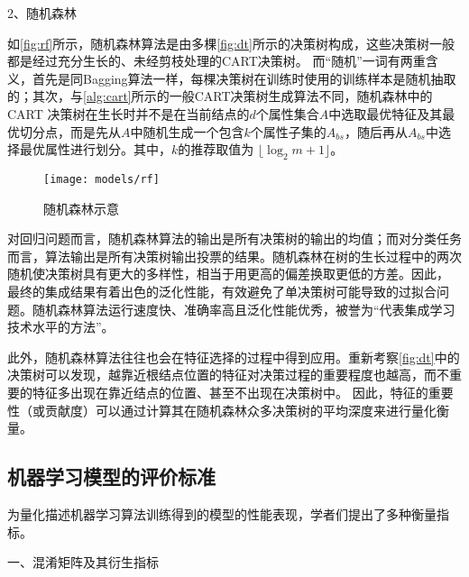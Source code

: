 2、随机森林

如\autoref{fig:rf}所示，随机森林算法是由多棵\autoref{fig:dt}所示的决策树构成，这些决策树一般都是经过充分生长的、未经剪枝处理的CART决策树。
而“随机”一词有两重含义，首先是同Bagging算法一样，每棵决策树在训练时使用的训练样本是随机抽取的；其次，与\autoref{alg:cart}所示的一般CART决策树生成算法不同，随机森林中的CART
决策树在生长时并不是在当前结点的$d$个属性集合$A$中选取最优特征及其最优切分点，而是先从$A$中随机生成一个包含$k$个属性子集的$A_{bs}$，随后再从$A_{bs}$中选择最优属性进行划分\cite{Zhou2016,Liu2018,breiman2001}。其中，$k$的推荐取值为
$\lfloor \log_2m + 1 \rfloor$\cite{breiman2001}。

\begin{figure}[htbp]
      \centering
      \texttt{[image: models/rf]}
      \caption{\label{fig:rf}随机森林示意}
\end{figure}

对回归问题而言，随机森林算法的输出是所有决策树的输出的均值；而对分类任务而言，算法输出是所有决策树输出投票的结果。随机森林在树的生长过程中的两次随机使决策树具有更大的多样性，相当于用更高的偏差换取更低的方差。因此，
最终的集成结果有着出色的泛化性能，有效避免了单决策树可能导致的过拟合问题。随机森林算法运行速度快、准确率高且泛化性能优秀，被誉为“代表集成学习技术水平的方法”\cite{Zhou2016,Liu2018}。

此外，随机森林算法往往也会在特征选择的过程中得到应用\cite{Aurélien2018}。重新考察\autoref{fig:dt}中的决策树可以发现，越靠近根结点位置的特征对决策过程的重要程度也越高，而不重要的特征多出现在靠近结点的位置、甚至不出现在决策树中。
因此，特征的重要性（或贡献度）可以通过计算其在随机森林众多决策树的平均深度来进行量化衡量。

\subsection{机器学习模型的评价标准}
为量化描述机器学习算法训练得到的模型的性能表现，学者们提出了多种衡量指标。

一、混淆矩阵及其衍生指标

